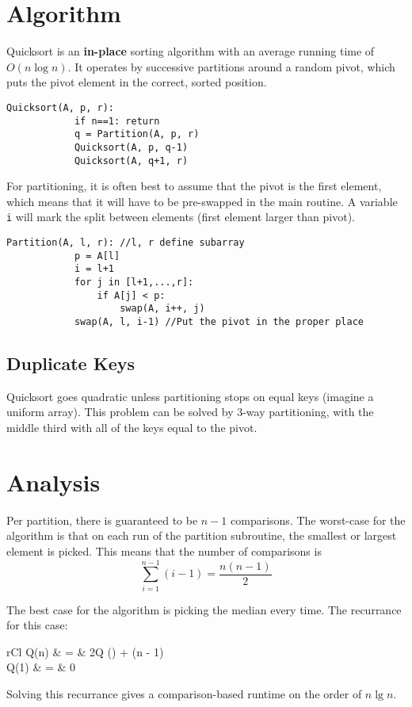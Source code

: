 \documentclass[11pt]{article}
\begin{document}
\section{Algorithm}
	Quicksort is an \textbf{in-place} sorting algorithm with an average running time of $O(n\log n)$. It operates by successive partitions around a random pivot, which puts the pivot element in the correct, sorted position.
	
	\begin{lstlisting}[autogobble=true]
		Quicksort(A, p, r):
			if n==1: return
			q = Partition(A, p, r)
			Quicksort(A, p, q-1)
			Quicksort(A, q+1, r)
	\end{lstlisting}
	
	For partitioning, it is often best to assume that the pivot is the first element, which means that it will have to be pre-swapped in the main routine. A variable \verb|i| will mark the split between elements (first element larger than pivot).
	
	\begin{lstlisting}[autogobble=true]
		Partition(A, l, r):	//l, r define subarray
			p = A[l]
			i = l+1
			for j in [l+1,...,r]:
				if A[j] < p:
					swap(A, i++, j)
			swap(A, l, i-1)	//Put the pivot in the proper place
	\end{lstlisting}
	
	\subsection{Duplicate Keys}
		Quicksort goes quadratic unless partitioning stops on equal keys (imagine a uniform array). This problem can be solved by 3-way partitioning, with the middle third with all of the keys equal to the pivot.
	
\section{Analysis}
	Per partition, there is guaranteed to be $n-1$ comparisons. The worst-case for the algorithm is that on each run of the partition subroutine, the smallest or largest element is picked. This means that the number of comparisons is
	\begin{equation}
		\sum_{i=1}^{n-1} (i - 1) = \frac{n(n-1)}{2}
	\end{equation}
	
	The best case for the algorithm is picking the median every time. The recurrance for this case:
	\begin{IEEEeqnarray}{rCl}
		Q(n) & = & 2Q \left(\right) + (n - 1)\\
		Q(1) & = & 0
	\end{IEEEeqnarray}
	Solving this recurrance gives a comparison-based runtime on the order of $n\lg n$.
	
\end{document}
